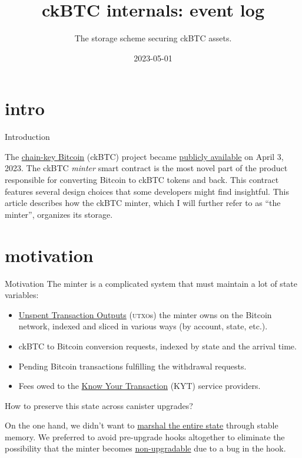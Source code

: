 \documentclass{article}
\title{ckBTC internals: event log}
\subtitle{The storage scheme securing ckBTC assets.}
\date{2023-05-01}
\begin{document}
\section{intro}{Introduction}
  
The \href{https://medium.com/dfinity/chain-key-bitcoin-a-decentralized-bitcoin-twin-ceb8f4ddf95e}{chain-key Bitcoin} (ckBTC) project became \href{https://twitter.com/dfinity/status/1642887821731004418}{publicly available} on April 3, 2023.
The ckBTC \emph{minter} smart contract is the most novel part of the product responsible for converting Bitcoin to ckBTC tokens and back.
This contract features several design choices that some developers might find insightful.
This article describes how the ckBTC minter, which I will further refer to as ``the minter'', organizes its storage.

\section{motivation}{Motivation}
The minter is a complicated system that must maintain a lot of state variables:

\begin{itemize}
    \item
    \href{https://en.wikipedia.org/wiki/Unspent_transaction_output}{Unspent Transaction Outputs} (\textsc{utxo}s) the minter owns on the Bitcoin network, indexed and sliced in various ways (by account, state, etc.).
    \item
    ckBTC to Bitcoin conversion requests, indexed by state and the arrival time.
    \item
    Pending Bitcoin transactions fulfilling the withdrawal requests.
    \item
    Fees owed to the \href{https://thepaypers.com/expert-opinion/know-your-transaction-kyt-the-key-to-combating-transaction-laundering--1246231}{Know Your Transaction} (KYT) service providers.
\end{itemize}

How to preserve this state across canister upgrades?

On the one hand, we didn't want to \href{/posts/11-ii-stable-memory.html#conventional-memory-management}{marshal the entire state} through stable memory.
We preferred to avoid pre-upgrade hooks altogether to eliminate the possibility that the minter becomes \href{/posts/01-effective-rust-canisters.html#upgrade-hook-panics}{non-upgradable} due to a bug in the hook.
\end{document}

